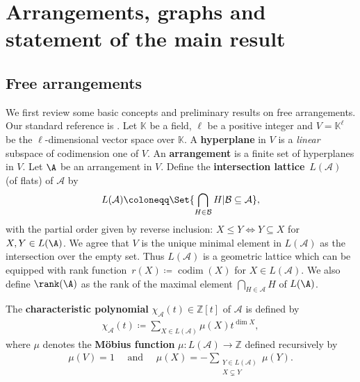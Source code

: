 \section{Arrangements, graphs and statement of the main result}
\label{sec:main-result}
\subsection{Free arrangements}
\label{subsec:free-arr}
 
We first review some basic concepts and preliminary results on free arrangements. Our standard reference is \cite{OT92}.
Let $\mathbb{K}$ be a field, $\ell$ be a positive integer and $V = \mathbb{K}^\ell$ be the  $ \ell $-dimensional vector space over $ \mathbb{K} $. 
A \textbf{hyperplane} in $V$ is a  \textit{linear} subspace of codimension one of $V$.
An \textbf{arrangement} is a finite set of hyperplanes in $V$. 
Let $\A$ be an arrangement in $V$. 
Define the \textbf{intersection lattice}~$ L(\mathcal{A}) $ (of flats) of $ \mathcal{A} $ by 
\begin{align*}
L(\mathcal{A}) \coloneqq \Set{\bigcap_{H \in \mathcal{B}}H  |  \mathcal{B} \subseteq \mathcal{A} },
\end{align*}
with the partial order given by reverse inclusion: $X\le Y\Leftrightarrow Y\subseteq X$ for $X, Y \in L(\A)$. 
We agree that $V $ is the unique minimal element in $ L(\mathcal{A}) $ as the intersection over the empty set. 
Thus $ L(\mathcal{A}) $ is a geometric lattice which can be equipped with rank function~$ r(X) \coloneqq \operatorname{codim}(X) $ for $X \in L(\mathcal{A})$. 
We also define $\rank(\A)$ as the rank of the maximal element $\bigcap_{H \in \mathcal{A}}H$ of $L(\A)$.

The \textbf{characteristic polynomial} $ \chi_{\mathcal{A}}(t) \in \mathbb{Z}[t] $ of $ \mathcal{A} $ is defined by
\begin{align*}
\chi_{\mathcal{A}}(t) \coloneqq \sum_{X \in L(\mathcal{A})}\mu(X)t^{\dim X}, 
\end{align*}
where $ \mu $ denotes the \textbf{M\"{o}bius function} $ \mu \colon L(\mathcal{A}) \to \mathbb{Z} $ defined recursively by 
\begin{align*}
\mu\left( V\right)= 1 
\quad \text{ and } \quad 
\mu(X) = -\sum_{\substack{Y \in L(\mathcal{A}) \\ X \subsetneq Y}}\mu(Y). 
\end{align*}

